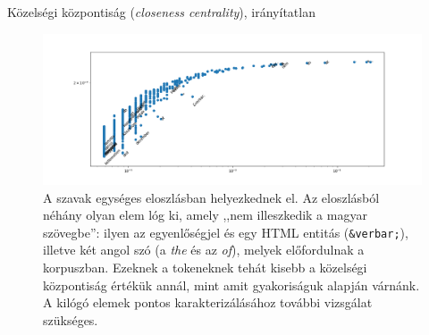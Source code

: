 \documentclass{beamer}
\newlength{\twocolwid}
\newcommand{\liex}[1]{\emph{#1}}
\begin{document}
\begin{frame}[t]
\begin{columns}[t]
\begin{column}{\twocolwid}
                  \begin{block}%
                    {Közelségi központiság (\emph{closeness centrality}),
                    irányítatlan} 
                    \begin{figure}[h]
                      \includegraphics[width=.7\columnwidth]{img/current-flow-closeness.png}
                      \caption{%
                        A szavak egységes eloszlásban helyezkednek el.
                      Az eloszlásból néhány olyan elem lóg ki, amely
                      ,,nem illeszkedik a magyar szövegbe'':
                      ilyen az egyenlőségjel és egy HTML entitás ({\tt \&verbar;}),
                      illetve két angol szó (a \liex{the} és az \liex{of}),
                      melyek előfordulnak a korpuszban.
                      Ezeknek a tokeneknek tehát kisebb
                      a közelségi központiság értékük annál,
                      mint amit gyakoriságuk alapján várnánk.
                      A kilógó elemek pontos karakterizálásához további vizsgálat szükséges.
                      }

                      \label{fig:closeness}
                    \end{figure}
                  \end{block}

        \hugeskip


\end{column}
\end{columns}
\end{frame}
\end{document}
